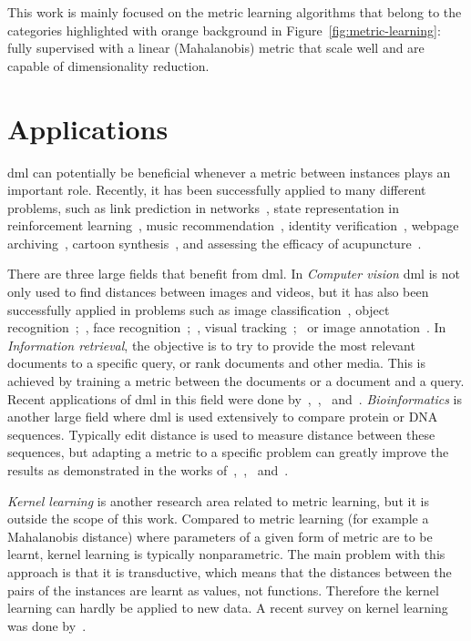 \documentclass[12pt,a4paper]{report}
\begin{document}
This work is mainly focused on the metric learning algorithms that belong to the categories highlighted with orange background in Figure~\ref{fig:metric-learning}: fully supervised with a linear (Mahalanobis) metric that scale well and are capable of dimensionality reduction. 

\section{Applications} \label{chap:intro:applications}

\Ac{dml} can potentially be beneficial whenever a metric between instances plays an important role. Recently, it has been successfully applied to many different problems, such as link prediction in networks~\citep{shaw2011learning}, state representation in reinforcement learning~\citep{taylor2011metric}, music recommendation~\citep{mcfee2012learning}, identity verification~\citep{ben2012improved}, webpage archiving~\citep{law2012structural}, cartoon synthesis~\citep{yu2012semisupervised}, and assessing the efficacy of acupuncture~\citep{liang2012learning}.

There are three large fields that benefit from \ac{dml}. In \textit{Computer vision} \ac{dml} is not only used to find distances between images and videos, but it has also been successfully applied in problems such as image classification~\citep{mensink2012metric}, object recognition~\citep{frome2007learning};~\citep{verma2012learning}, face recognition~\citep{guillaumin2009you};~\citep{lu2014neighborhood}, visual tracking~\citep{li2012non};~\citep{jiang2012order} or image annotation~\citep{guillaumin2009tagprop}. In \textit{Information retrieval}, the objective is to try to provide the most relevant documents to a specific query, or rank documents and other media. This is achieved by training a metric between the documents or a document and a query. Recent applications of \ac{dml} in this field were done by~\citep{lebanon2006metric},~\citep{lee2008rank},~\citep{mcfee2010metric} and~\citep{lim2013robust}. \textit{Bioinformatics} is another large field where \ac{dml} is used extensively to compare protein or DNA sequences. Typically edit distance is used to measure distance between these sequences, but adapting a metric to a specific problem can greatly improve the results as demonstrated in the works of~\citep{xiong2006kernel},~\citep{saigo2006optimizing},~\citep{kato2010metric} and~\citep{wang2012prodis}.

\textit{Kernel learning} is another research area related to metric learning, but it is outside the scope of this work. Compared to metric learning (for example a Mahalanobis distance) where parameters of a given form of metric are to be learnt, kernel learning is typically nonparametric. The main problem with this approach is that it is transductive, which means that the distances between the pairs of the instances are learnt as values, not functions. Therefore the kernel learning can hardly be applied to new data. A recent survey on kernel learning was done by~\citep{abbasnejad2012survey}.
\end{document}
